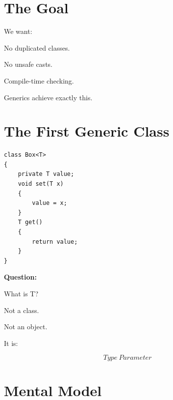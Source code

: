 \documentclass[11pt,a4paper]{book}
\begin{document}

\section{The Goal}

We want:


No duplicated classes.


No unsafe casts.


Compile-time checking.


Generics achieve exactly this.


\section{The First Generic Class}

\begin{verbatim}
class Box<T>
{
    private T value;
    void set(T x)
    {
        value = x;
    }
    T get()
    {
        return value;
    }
}
\end{verbatim}


\textbf{Question:}

What is T?


Not a class.


Not an object.


It is:

\[
Type\ Parameter
\]


\section{Mental Model}
\end{document}
